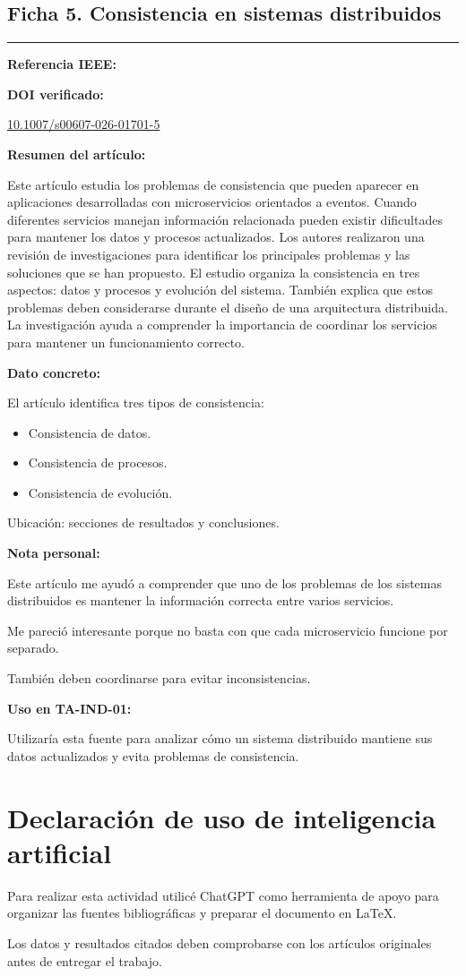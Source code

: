 \documentclass[12pt,a4paper]{article}
\newcommand{\ficha}[7]{

\subsection*{#1}

\noindent
{\color{azul}\rule{\linewidth}{0.8pt}}

\textbf{Referencia IEEE:}

\fullcite{#2}

\textbf{DOI verificado:}

\href{https://doi.org/#3}{#3}

\textbf{Resumen del artículo:}

#4

\textbf{Dato concreto:}

#5

\textbf{Nota personal:}

#6

\textbf{Uso en TA-IND-01:}

#7

\vspace{6mm}
}
\begin{document}
\ficha
{Ficha 5. Consistencia en sistemas distribuidos}
{bacao2026}
{10.1007/s00607-026-01701-5}
{
Este artículo estudia los
problemas de consistencia
que pueden aparecer en
aplicaciones desarrolladas
con microservicios orientados
a eventos. Cuando diferentes
servicios manejan información
relacionada pueden existir
dificultades para mantener
los datos y procesos actualizados.
Los autores realizaron una revisión
de investigaciones para identificar
los principales problemas
y las soluciones que se han
propuesto. El estudio organiza
la consistencia en tres aspectos:
datos y procesos y evolución
del sistema. También explica
que estos problemas deben
considerarse durante el diseño
de una arquitectura distribuida.
La investigación ayuda
a comprender la importancia
de coordinar los servicios
para mantener un funcionamiento
correcto.
}
{
El artículo identifica tres tipos
de consistencia:

\begin{itemize}[nosep]
\item Consistencia de datos.
\item Consistencia de procesos.
\item Consistencia de evolución.
\end{itemize}

Ubicación: secciones de resultados
y conclusiones.
}
{
Este artículo me ayudó a comprender
que uno de los problemas de los
sistemas distribuidos es mantener
la información correcta
entre varios servicios.

Me pareció interesante porque
no basta con que cada microservicio
funcione por separado.

También deben coordinarse
para evitar inconsistencias.
}
{
Utilizaría esta fuente
para analizar cómo un sistema
distribuido mantiene sus datos
actualizados y evita problemas
de consistencia.
}


\newpage

\nocite{
tighilt2023,
assuncao2023,
mohottige2025,
nicolas2024,
bacao2026
}

\printbibliography[
title={Referencias bibliográficas}
]


\section*{Declaración de uso
de inteligencia artificial}

Para realizar esta actividad
utilicé ChatGPT como herramienta
de apoyo para organizar
las fuentes bibliográficas
y preparar el documento en LaTeX.

Los datos y resultados citados
deben comprobarse con
los artículos originales
antes de entregar el trabajo.
\end{document}
